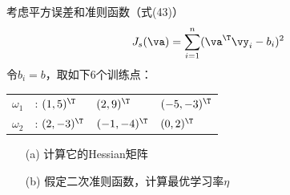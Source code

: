 \documentclass[reportComp]{thesis}
\begin{document}
\begin{question}[\textsection 5 Q14]
考虑平方误差和准则函数（式(43)）
\[J_s(\va)=\sum_{i=1}^n(\va^\T \vy_i-b_i)^2\]
令$b_i=b$，取如下6个训练点：
\begin{center}
\begin{tabular}{llll}
$\omega_1$&: $(1,5)^\T$  & $(2,9)^\T$  & $(-5,-3)^\T$ \\
$\omega_2$&: $(2,-3)^\T$  & $(-1,-4)^\T$  & $(0,2)^\T$ 
\end{tabular}
\end{center}
\begin{itemize}
	\item [(a)] 计算它的Hessian矩阵
	\item [(b)] 假定二次准则函数，计算最优学习率$\eta$
\end{itemize}
\end{question}
\end{document}
